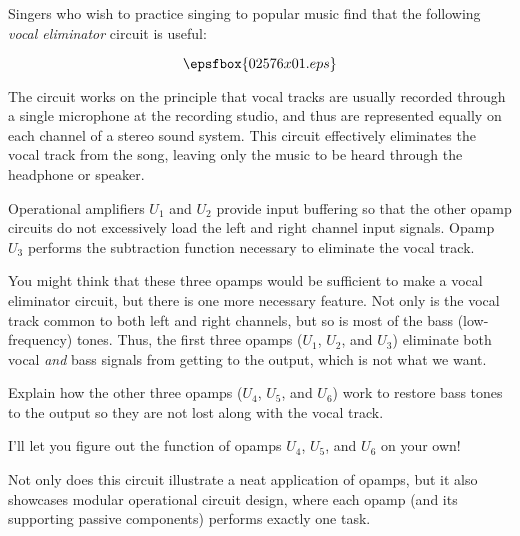 

Singers who wish to practice singing to popular music find that the following {\it vocal eliminator} circuit is useful:

$$\epsfbox{02576x01.eps}$$

The circuit works on the principle that vocal tracks are usually recorded through a single microphone at the recording studio, and thus are represented equally on each channel of a stereo sound system.  This circuit effectively eliminates the vocal track from the song, leaving only the music to be heard through the headphone or speaker.

Operational amplifiers $U_1$ and $U_2$ provide input buffering so that the other opamp circuits do not excessively load the left and right channel input signals.  Opamp $U_3$ performs the subtraction function necessary to eliminate the vocal track.  

You might think that these three opamps would be sufficient to make a vocal eliminator circuit, but there is one more necessary feature.  Not only is the vocal track common to both left and right channels, but so is most of the bass (low-frequency) tones.  Thus, the first three opamps ($U_1$, $U_2$, and $U_3$) eliminate both vocal {\it and} bass signals from getting to the output, which is not what we want.

Explain how the other three opamps ($U_4$, $U_5$, and $U_6$) work to restore bass tones to the output so they are not lost along with the vocal track.







I'll let you figure out the function of opamps $U_4$, $U_5$, and $U_6$ on your own!







Not only does this circuit illustrate a neat application of opamps, but it also showcases modular operational circuit design, where each opamp (and its supporting passive components) performs exactly one task.




